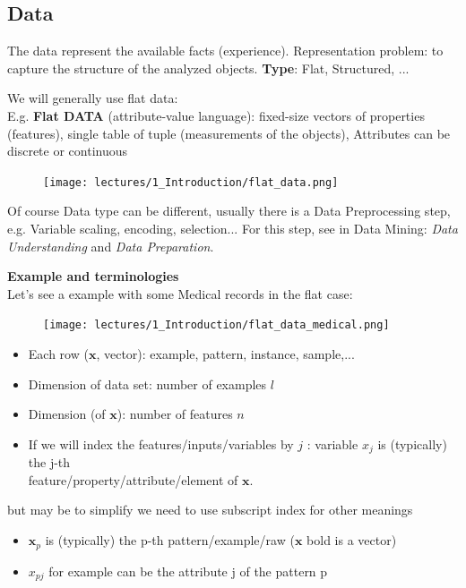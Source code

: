 \documentclass[../main.tex]{subfiles}
\begin{document}
\subsection{Data}
The data represent the available facts (experience). Representation problem: to capture the structure of the analyzed objects. \textbf{Type}: Flat, Structured, ...

\noindent We will generally use flat data:\\
 E.g. \textbf{Flat DATA} (attribute-value language): fixed-size vectors of properties (features), single table of tuple (measurements of the objects), Attributes can be discrete or continuous

\begin{figure}[H]
\centering
\texttt{[image: lectures/1\_Introduction/flat\_data.png]}
\end{figure}
Of course Data type can be different, usually there is a Data Preprocessing step, e.g. Variable scaling, encoding, selection...
For this step, see in Data Mining: \textit{Data Understanding} and \textit{Data Preparation}.

\noindent\textbf{Example and terminologies}\\
Let's see a example with some Medical records in the flat case: 

\begin{figure}[H]
\centering
\texttt{[image: lectures/1\_Introduction/flat\_data\_medical.png]}
\end{figure}

\begin{itemize}
    \item Each row ($\mathbf{x}$, vector): example, pattern, instance, sample,...
    \item Dimension of data set: number of examples $l$
    \item Dimension (of $\mathbf{x}$): number of features $n$
    \item If we will index the features/inputs/variables by $j$ : 
	variable $x_j$ is (typically) the j-th \\ feature/property/attribute/element of $\mathbf{x}$.
\end{itemize}
but may be to simplify we need to use subscript index for other meanings
\begin{itemize}
    \item $\textbf{x}_p$ is (typically) the p-th pattern/example/raw ($\textbf{x}$ bold is a vector)
    \item $x_{pj}$ for example can be the attribute j of the pattern p
\end{itemize}
\end{document}
